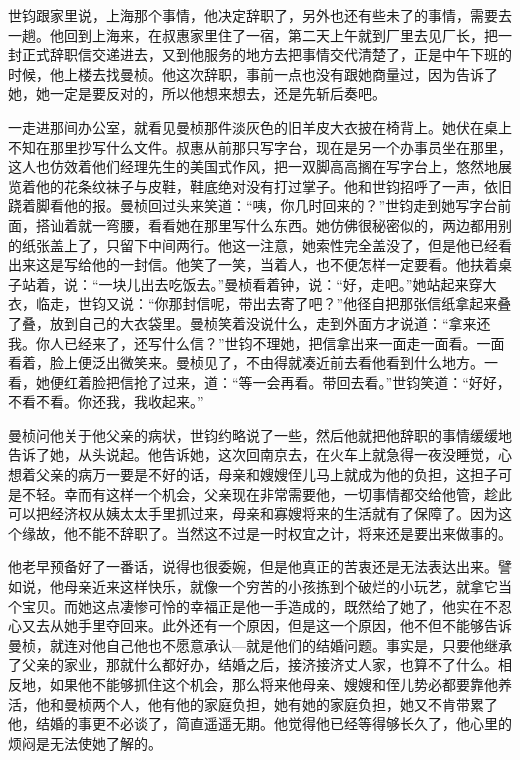 \par 世钧跟家里说，上海那个事情，他决定辞职了，另外也还有些未了的事情，需要去一趟。他回到上海来，在叔惠家里住了一宿，第二天上午就到厂里去见厂长，把一封正式辞职信交递进去，又到他服务的地方去把事情交代清楚了，正是中午下班的时候，他上楼去找曼桢。他这次辞职，事前一点也没有跟她商量过，因为告诉了她，她一定是要反对的，所以他想来想去，还是先斩后奏吧。
\par 一走进那间办公室，就看见曼桢那件淡灰色的旧羊皮大衣披在椅背上。她伏在桌上不知在那里抄写什么文件。叔惠从前那只写字台，现在是另一个办事员坐在那里，这人也仿效着他们经理先生的美国式作风，把一双脚高高搁在写字台上，悠然地展览着他的花条纹袜子与皮鞋，鞋底绝对没有打过掌子。他和世钧招呼了一声，依旧跷着脚看他的报。曼桢回过头来笑道：“咦，你几时回来的？”世钧走到她写字台前面，搭讪着就一弯腰，看看她在那里写什么东西。她仿佛很秘密似的，两边都用别的纸张盖上了，只留下中间两行。他这一注意，她索性完全盖没了，但是他已经看出来这是写给他的一封信。他笑了一笑，当着人，也不便怎样一定要看。他扶着桌子站着，说：“一块儿出去吃饭去。”曼桢看着钟，说：“好，走吧。”她站起来穿大衣，临走，世钧又说：“你那封信呢，带出去寄了吧？”他径自把那张信纸拿起来叠了叠，放到自己的大衣袋里。曼桢笑着没说什么，走到外面方才说道：“拿来还我。你人已经来了，还写什么信？”世钧不理她，把信拿出来一面走一面看。一面看着，脸上便泛出微笑来。曼桢见了，不由得就凑近前去看他看到什么地方。一看，她便红着脸把信抢了过来，道：“等一会再看。带回去看。”世钧笑道：“好好，不看不看。你还我，我收起来。”
\par 曼桢问他关于他父亲的病状，世钧约略说了一些，然后他就把他辞职的事情缓缓地告诉了她，从头说起。他告诉她，这次回南京去，在火车上就急得一夜没睡觉，心想着父亲的病万一要是不好的话，母亲和嫂嫂侄儿马上就成为他的负担，这担子可是不轻。幸而有这样一个机会，父亲现在非常需要他，一切事情都交给他管，趁此可以把经济权从姨太太手里抓过来，母亲和寡嫂将来的生活就有了保障了。因为这个缘故，他不能不辞职了。当然这不过是一时权宜之计，将来还是要出来做事的。
\par 他老早预备好了一番话，说得也很委婉，但是他真正的苦衷还是无法表达出来。譬如说，他母亲近来这样快乐，就像一个穷苦的小孩拣到个破烂的小玩艺，就拿它当个宝贝。而她这点凄惨可怜的幸福正是他一手造成的，既然给了她了，他实在不忍心又去从她手里夺回来。此外还有一个原因，但是这一个原因，他不但不能够告诉曼桢，就连对他自己他也不愿意承认—就是他们的结婚问题。事实是，只要他继承了父亲的家业，那就什么都好办，结婚之后，接济接济丈人家，也算不了什么。相反地，如果他不能够抓住这个机会，那么将来他母亲、嫂嫂和侄儿势必都要靠他养活，他和曼桢两个人，他有他的家庭负担，她有她的家庭负担，她又不肯带累了他，结婚的事更不必谈了，简直遥遥无期。他觉得他已经等得够长久了，他心里的烦闷是无法使她了解的。
